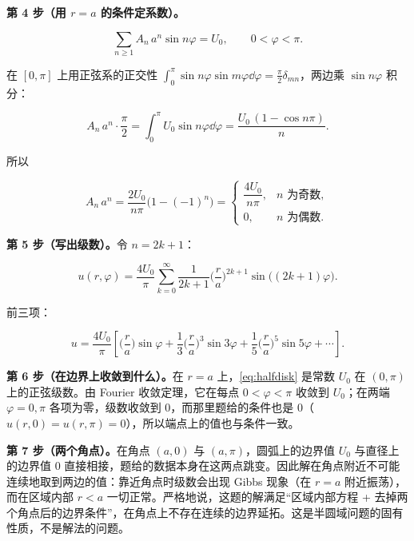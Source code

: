 \documentclass[11pt]{ctexart}
\begin{document}
\textbf{第 4 步（用 $r=a$ 的条件定系数）。}

\[
\sum_{n\ge1}A_n\,a^n\sin n\varphi=U_0,\qquad 0<\varphi<\pi .
\]

在 $[0,\pi]$ 上用正弦系的正交性 $\displaystyle\int_0^\pi\sin n\varphi\sin m\varphi\dd\varphi=\frac\pi2\delta_{mn}$，两边乘 $\sin n\varphi$ 积分：

\[
A_n\,a^n\cdot\frac\pi2=\int_0^\pi U_0\sin n\varphi\dd\varphi=\frac{U_0\,(1-\cos n\pi)}{n}.
\]

所以

\[
A_n\,a^n=\frac{2U_0}{n\pi}\big(1-(-1)^n\big)=
\begin{cases}
\dfrac{4U_0}{n\pi}, & n\text{ 为奇数},\\[6pt]
0, & n\text{ 为偶数}.
\end{cases}
\]

\textbf{第 5 步（写出级数）。}令 $n=2k+1$：

\begin{equation}
u(r,\varphi)=\frac{4U_0}{\pi}\sum_{k=0}^{\infty}\frac{1}{2k+1}\Big(\frac{r}{a}\Big)^{2k+1}\sin\big((2k+1)\varphi\big).
\label{eq:halfdisk}
\end{equation}

前三项：

\[
u=\frac{4U_0}{\pi}\left[\Big(\frac ra\Big)\sin\varphi+\frac13\Big(\frac ra\Big)^{3}\sin3\varphi+\frac15\Big(\frac ra\Big)^{5}\sin5\varphi+\cdots\right].
\]

\textbf{第 6 步（在边界上收敛到什么）。}在 $r=a$ 上，\eqref{eq:halfdisk} 是常数 $U_0$ 在 $(0,\pi)$ 上的正弦级数。由 Fourier 收敛定理，它在每点 $0<\varphi<\pi$ 收敛到 $U_0$；在两端 $\varphi=0,\pi$ 各项为零，级数收敛到 $0$，而那里题给的条件也是 $0$（$u(r,0)=u(r,\pi)=0$），所以端点上的值也与条件一致。

\textbf{第 7 步（两个角点）。}在角点 $(a,0)$ 与 $(a,\pi)$，圆弧上的边界值 $U_0$ 与直径上的边界值 $0$ 直接相接，题给的数据本身在这两点跳变。因此解在角点附近不可能连续地取到两边的值：靠近角点时级数会出现 Gibbs 现象（在 $r=a$ 附近振荡），而在区域内部 $r<a$ 一切正常。严格地说，这题的解满足“区域内部方程 + 去掉两个角点后的边界条件”，在角点上不存在连续的边界延拓。这是半圆域问题的固有性质，不是解法的问题。

\end{document}
